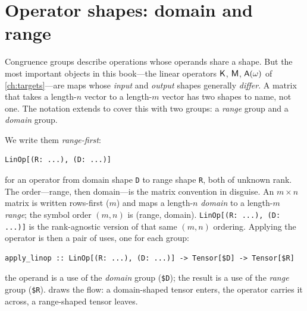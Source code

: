 \section{Operator shapes: domain and range}
\label{sec:sh-operators}

Congruence groups describe operations whose operands share a shape. But the
most important objects in this book---the linear operators $\mathsf{K}$, $\mathsf{M}$,
$\mathsf{A}(\omega)$ of \cref{ch:targets}---are maps whose \emph{input} and
\emph{output} shapes generally \emph{differ}. A matrix that takes a length-$n$
vector to a length-$m$ vector has two shapes to name, not one. The notation
extends to cover this with two groups: a \emph{range} group and a
\emph{domain} group.

We write them \emph{range-first}:
\begin{lstlisting}[style=l4style]
LinOp[(R: ...), (D: ...)]
\end{lstlisting}
for an operator from domain shape \texttt{D} to range shape \texttt{R}, both
of unknown rank. The order---range, then domain---is the matrix convention in
disguise. An $m\times n$ matrix is written rows-first ($m$) and maps a
length-$n$ \emph{domain} to a length-$m$ \emph{range}; the symbol order
$(m,n)$ is (range, domain). \lstinline[style=l4style]|LinOp[(R: ...), (D: ...)]|
is the rank-agnostic version of that same $(m,n)$ ordering. Applying the
operator is then a pair of uses, one for each group:
\begin{lstlisting}[style=l4style]
apply_linop :: LinOp[(R: ...), (D: ...)] -> Tensor[$D] -> Tensor[$R]
\end{lstlisting}
the operand is a use of the \emph{domain} group (\lstinline[style=l4style]|$D|);
the result is a use of the \emph{range} group (\lstinline[style=l4style]|$R|).
 draws the flow: a domain-shaped tensor enters, the
operator carries it across, a range-shaped tensor leaves.

